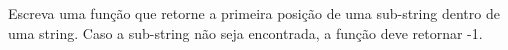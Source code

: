 
\question[10]

Escreva uma função que retorne a primeira posição de uma sub-string dentro de uma string. Caso a sub-string não seja encontrada, a função deve retornar -1.